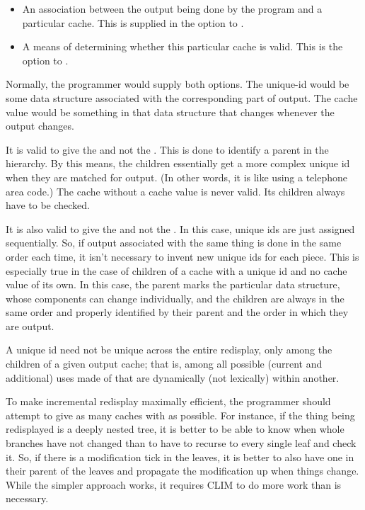 \begin{itemize}
\item An association between the output being done by the program and a
particular cache.  This is supplied in the  option to
.

\item A means of determining whether this particular cache is valid.  This is
the  option to .
\end{itemize}

Normally, the programmer would supply both options. The unique-id would be some
data structure associated with the corresponding part of output.  The cache
value would be something in that data structure that changes whenever the output
changes.

It is valid to give the  and not the .  This is
done to identify a parent in the hierarchy.  By this means, the children
essentially get a more complex unique id when they are matched for output.  (In
other words, it is like using a telephone area code.)  The cache without a cache
value is never valid.  Its children always have to be checked.

It is also valid to give the  and not the .  In
this case, unique ids are just assigned sequentially.  So, if output associated
with the same thing is done in the same order each time, it isn't necessary to
invent new unique ids for each piece.  This is especially true in the case of
children of a cache with a unique id and no cache value of its own.  In this
case, the parent marks the particular data structure, whose components can
change individually, and the children are always in the same order and properly
identified by their parent and the order in which they are output.

A unique id need not be unique across the entire redisplay, only among the
children of a given output cache; that is, among all possible (current and
additional) uses made of  that are dynamically (not
lexically) within another.

To make incremental redisplay maximally efficient, the programmer should attempt
to give as many caches with  as possible.  For instance, if the
thing being redisplayed is a deeply nested tree, it is better to be able to know
when whole branches have not changed than to have to recurse to every single
leaf and check it.  So, if there is a modification tick in the leaves, it is
better to also have one in their parent of the leaves and propagate the
modification up when things change.  While the simpler approach works, it
requires CLIM to do more work than is necessary.

